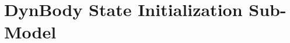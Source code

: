 %

\renewcommand\modelpartname{DynBody State Initialization Sub-Model}
\renewcommand\modelpartid{DynBodyInit}
\part{\modelpartname}\label{part:\modelpartid}





